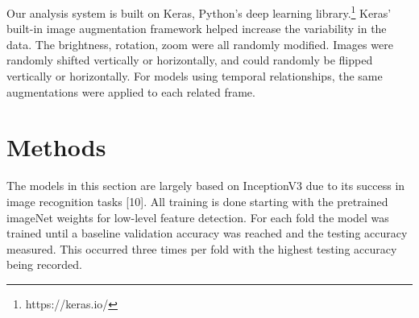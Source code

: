 \documentclass[letterpaper, 10 pt, conference]{ieeeconf}  %
\begin{document}

Our analysis system is built on Keras, Python's deep learning library.\footnote{https://keras.io/} Keras' built-in image augmentation framework helped increase the variability in the data. The brightness, rotation, zoom were all randomly modified. Images were randomly shifted vertically or horizontally, and could randomly be flipped vertically or horizontally. For models using temporal relationships, the same augmentations were applied to each related frame. 



\section{Methods}\label{sec:methods}
The models in this section are largely based on InceptionV3 due to its success in image recognition tasks [10]. All training is done starting with the pretrained imageNet weights for low-level feature detection. For each fold the model was trained until a baseline validation accuracy was reached and the testing accuracy measured. This occurred three times per fold with the highest testing accuracy being recorded.

\end{document}
